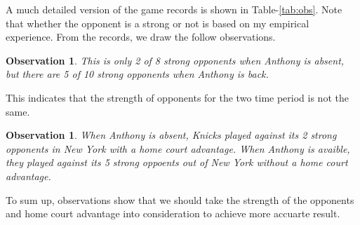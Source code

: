 \documentclass[12pt]{article}
\newtheorem{observation}[theorem]{Observation}
\begin{document}
A much detailed version of the game records is shown in
Table-\ref{tab:obs}. Note that whether the opponent is a strong or not
is based on my empirical experience. From the records, we draw the
follow observations. \\

\begin{observation}
This is only 2 of 8 strong opponents when Anthony is absent, but there
are 5 of 10 strong opponents when Anthony is back.
\end{observation}

This indicates that the strength of opponents for the two time period
is not the same.

\begin{observation}
When Anthony is absent, Knicks played against its 2 strong opponents
in New York with a home court advantage. When Anthony is avaible, they
played against its 5 strong oppoents out of New York without a home
court advantage.
\end{observation}

To sum up, observations show that we should take the strength of the
opponents and home court advantage into consideration to achieve more
accuarte result.
\end{document}
